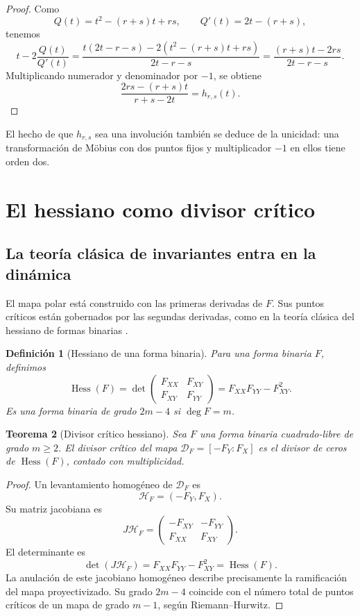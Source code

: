 \documentclass[11pt,oneside]{scrartcl}
\theoremstyle{plainblue}
\newtheorem{theorem}{Teorema}[section]
\theoremstyle{definitionblue}
\newtheorem{definition}[theorem]{Definición}
\theoremstyle{remarkgray}
\newcommand{\Hess}{\operatorname{Hess}}
\newcommand{\cD}{\mathcal{D}}
\newcommand{\cH}{\mathcal{H}}
\begin{document}
\begin{proof}
Como
\[
Q(t)=t^2-(r+s)t+rs,
\qquad
Q'(t)=2t-(r+s),
\]
tenemos
\[
t-2\frac{Q(t)}{Q'(t)}
=\frac{t(2t-r-s)-2(t^2-(r+s)t+rs)}{2t-r-s}
=\frac{(r+s)t-2rs}{2t-r-s}.
\]
Multiplicando numerador y denominador por \(-1\), se obtiene
\[
\frac{2rs-(r+s)t}{r+s-2t}=h_{r,s}(t).
\]
\end{proof}

El hecho de que \(h_{r,s}\) sea una involución también se deduce de la unicidad:
una transformación de Möbius con dos puntos fijos y multiplicador \(-1\) en ellos
tiene orden dos.

\section{El hessiano como divisor crítico}

\subsection{La teoría clásica de invariantes entra en la dinámica}

El mapa polar está construido con las primeras derivadas de \(F\). Sus puntos
críticos están gobernados por las segundas derivadas, como en la teoría clásica del
hessiano de formas binarias \cite{Olver}.

\begin{definition}[Hessiano de una forma binaria]
Para una forma binaria \(F\), definimos
\begin{equation}\label{eq:hessian}
\Hess(F)=
\det\begin{pmatrix}
F_{XX}&F_{XY}\\
F_{XY}&F_{YY}
\end{pmatrix}
=F_{XX}F_{YY}-F_{XY}^2.
\end{equation}
Es una forma binaria de grado \(2m-4\) si \(\deg F=m\).
\end{definition}

\begin{theorem}[Divisor crítico hessiano]\label{thm:hessian-critical}
Sea \(F\) una forma binaria cuadrado-libre de grado \(m\ge2\). El divisor crítico del
mapa \(\cD_F=[-F_Y:F_X]\) es el divisor de ceros de \(\Hess(F)\), contado con
multiplicidad.
\end{theorem}

\begin{proof}
Un levantamiento homogéneo de \(\cD_F\) es
\[
\cH_F=(-F_Y,F_X).
\]
Su matriz jacobiana es
\[
J\cH_F=
\begin{pmatrix}
-F_{XY}&-F_{YY}\\
F_{XX}&F_{XY}
\end{pmatrix}.
\]
El determinante es
\[
\det(J\cH_F)=F_{XX}F_{YY}-F_{XY}^2=\Hess(F).
\]
La anulación de este jacobiano homogéneo describe precisamente la ramificación del
mapa proyectivizado. Su grado \(2m-4\) coincide con el número total de puntos críticos
de un mapa de grado \(m-1\), según Riemann--Hurwitz.
\end{proof}
\end{document}
